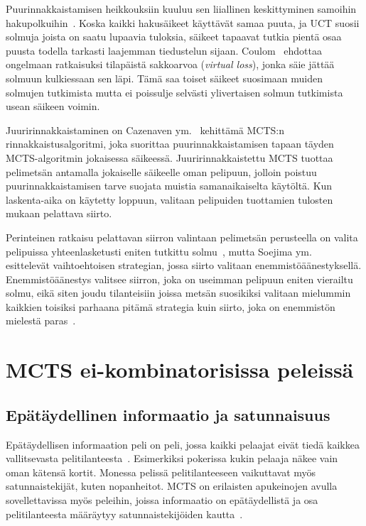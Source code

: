 \documentclass[12pt,finnish]{tktltiki2}
\theoremstyle{definition}
\theoremstyle{remark}
\begin{document}
Puurinnakkaistamisen heikkouksiin kuuluu sen liiallinen keskittyminen samoihin hakupolkuihin~\cite{browne, chaslot}. Koska kaikki hakusäikeet käyttävät samaa puuta, ja UCT suosii solmuja joista on saatu lupaavia tuloksia, säikeet tapaavat tutkia pientä osaa puusta todella tarkasti laajemman tiedustelun sijaan. Coulom~\cite{chaslot} ehdottaa ongelmaan ratkaisuksi tilapäistä sakkoarvoa (\textit{virtual loss}), jonka säie jättää solmuun kulkiessaan sen läpi. Tämä saa toiset säikeet suosimaan muiden solmujen tutkimista mutta ei poissulje selvästi ylivertaisen solmun tutkimista usean säikeen voimin.

Juuririnnakkaistaminen on Cazenaven ym.~\cite{cazenave} kehittämä MCTS:n rinnakkaistusalgoritmi, joka suorittaa puurinnakkaistamisen tapaan täyden MCTS-algoritmin jokaisessa säikeessä. Juuririnnakkaistettu MCTS tuottaa pelimetsän antamalla jokaiselle säikeelle oman pelipuun, jolloin poistuu puurinnakkaistamisen tarve suojata muistia samanaikaiselta käytöltä. Kun laskenta-aika on käytetty loppuun, valitaan pelipuiden tuottamien tulosten mukaan pelattava siirto.

Perinteinen ratkaisu pelattavan siirron valintaan pelimetsän perusteella on valita pelipuissa yhteenlasketusti eniten tutkittu solmu~\cite{browne}, mutta Soejima ym.~\cite{soejima} esittelevät vaihtoehtoisen strategian, jossa siirto valitaan enemmistöäänestyksellä. Enemmistöäänestys valitsee siirron, joka on useimman pelipuun eniten vierailtu solmu, eikä siten joudu tilanteisiin joissa metsän suosikiksi valitaan mielummin kaikkien toisiksi parhaana pitämä strategia kuin siirto, joka on enemmistön mielestä paras~\cite{soejima}.

\section{MCTS ei-kombinatorisissa peleissä}

\subsection{Epätäydellinen informaatio ja satunnaisuus}

Epätäydellisen informaation peli on peli, jossa kaikki pelaajat eivät tiedä kaikkea vallitsevasta pelitilanteesta~\cite{browne}. Esimerkiksi pokerissa kukin pelaaja näkee vain oman kätensä kortit. Monessa pelissä pelitilanteeseen vaikuttavat myös satunnaistekijät, kuten nopanheitot. MCTS on erilaisten apukeinojen avulla sovellettavissa myös peleihin, joissa informaatio on epätäydellistä ja osa pelitilanteesta määräytyy satunnaistekijöiden kautta~\cite{browne}.
\end{document}
